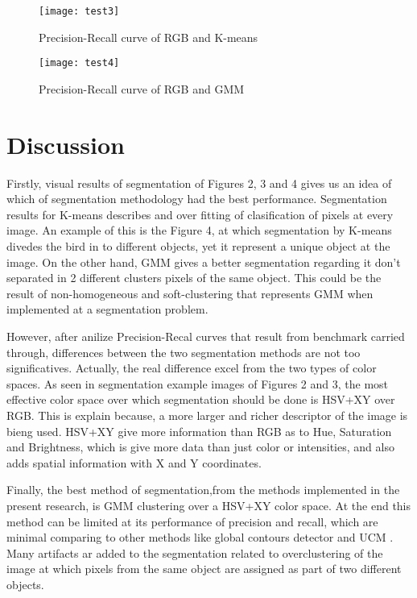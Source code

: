\documentclass[10pt,twocolumn,letterpaper]{article}
\begin{document}
\begin{figure}[h]
    \texttt{[image: test3]}
    \caption{Precision-Recall curve of RGB and K-means}
\end{figure}

\begin{figure}[h]
    \texttt{[image: test4]}
    \caption{Precision-Recall curve of RGB and GMM}
\end{figure}

\section{Discussion}

Firstly, visual results of segmentation of Figures 2, 3 and 4 gives us an idea of which of segmentation methodology had the best performance. 
Segmentation results for K-means describes and over fitting of clasification of pixels at every image. An example of this is the Figure 4, at which segmentation by K-means divedes the bird in to different objects, yet it represent a unique object at the image. On the other hand, GMM gives a better segmentation regarding it don't separated in 2 different clusters pixels of the same object. This could be the result of non-homogeneous and soft-clustering that represents GMM when implemented at a segmentation problem.

However, after anilize Precision-Recal curves that result from benchmark carried through, differences between the two segmentation methods are not too significatives. Actually, the real difference excel from the two types of color spaces. As seen in segmentation example images of Figures 2 and 3, the most effective  color space over which segmentation should be done is HSV+XY over RGB. This is explain because, a more larger and richer descriptor of the image is bieng used. HSV+XY give more information than RGB as to Hue, Saturation and Brightness, which is give more data than just color or intensities, and also adds spatial information with X and Y coordinates.

Finally, the best method of segmentation,from the methods implemented in the present research, is GMM clustering over a HSV+XY color space. At the end this method can be limited at its performance of precision and recall, which are minimal comparing to other methods like global contours detector and UCM \cite{bsbds}\cite{amfm_pami2011}. Many artifacts ar added to the segmentation related to overclustering of the image at which pixels from the same object are assigned as part of two different objects.
\end{document}
